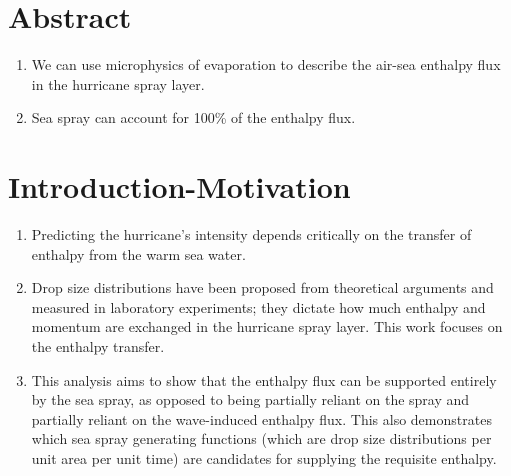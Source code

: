 \documentclass[10pt,a4paper]{article}
\begin{document}
 \renewcommand{\theenumi}{\Roman{enumi}}
 \renewcommand{\theenumii}{\arabic{enumii}}
 \renewcommand{\theenumiii}{\alpha{enumiii}}
\section{Abstract}
\begin{enumerate}
\item We can use microphysics of evaporation to describe the air-sea enthalpy flux in the hurricane spray layer.\\
\item Sea spray can account for 100\% of the enthalpy flux.
\end{enumerate}

\section{Introduction-Motivation}
\begin{enumerate}
\item Predicting the hurricane's intensity depends critically on the transfer of enthalpy from the warm sea water.
\item Drop size distributions have been proposed from theoretical arguments and measured in laboratory experiments; they dictate how much enthalpy and momentum are exchanged in the hurricane spray layer. This work focuses on the enthalpy transfer. 
\item This analysis aims to show that the enthalpy flux can be supported entirely by the sea spray, as opposed to being partially reliant on the spray and partially reliant on the wave-induced enthalpy flux. This also demonstrates which sea spray generating functions (which are drop size distributions per unit area per unit time) are candidates for supplying the requisite enthalpy.
\end{enumerate}
\end{document}
